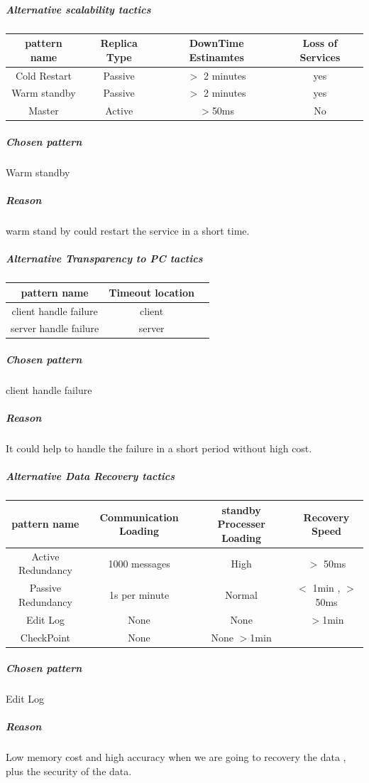 \documentclass{article}
\begin{document}
			
			\subparagraph{Alternative scalability tactics}
					\begin{center}
						\begin{tabular}{|c|c|c|c|}
							\hline
							pattern name & Replica Type & DownTime Estinamtes & Loss of Services\\
							\hline
							Cold Restart & Passive 		& $>$ 2 minutes			  & yes			\\
							\hline
							Warm standby & Passive     &  $>$ 2 minutes			  & yes			\\
							\hline
							Master		 & Active		& $>$50ms & No\\
							\hline
						\end{tabular}
					\end{center}
					\subparagraph{Chosen pattern} 
					Warm standby
					\subparagraph{Reason} 
					warm stand by could restart the service in a short time.
			\subparagraph{Alternative Transparency to PC tactics}
					\begin{center}
						\begin{tabular}{|c|c|c|}
							\hline
							pattern name & Timeout location\\
							\hline
							client handle failure & client \\
							\hline
							server handle failure & server\\ 
							\hline
						\end{tabular}
					\end{center}
					\subparagraph{Chosen pattern} 
					client handle failure 
					\subparagraph{Reason} 
					It could help to handle the failure in a short period without high cost.
			\subparagraph{Alternative Data Recovery tactics}
					\begin{center}
						\begin{tabular}{|c|c|c|c|}
							\hline
							pattern name & Communication Loading & standby Processer Loading & Recovery Speed\\
							\hline
							Active Redundancy & 1000 messages & High & $>$ 50ms \\
							\hline
							Passive Redundancy & 1s per minute & Normal & $<$ 1min , $>$ 50ms \\
							\hline
							Edit Log 	& None & None & $>$1min\\
							\hline
							CheckPoint & None & None $> $1min\\
							\hline
						\end{tabular}
					\end{center}
					\subparagraph{Chosen pattern} 
					Edit Log
					\subparagraph{Reason} 
					Low memory cost and high accuracy when we are going to recovery the data , plus the security of the data.
					
\end{document}
